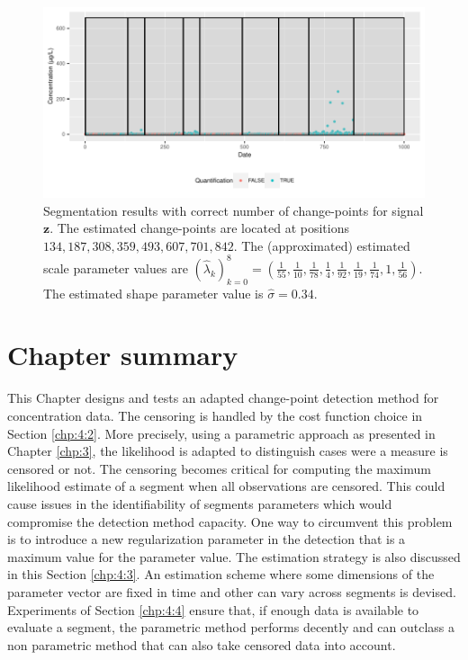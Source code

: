 \begin{figure}[htbp]
    \centering
    \includegraphics{figs/Chap4/y_sim2_detect.pdf}
    \caption{Segmentation results with correct number of change-points for signal $\bm z$. The estimated change-points are located at positions $134,187,308,359,493,607,701,842$. The (approximated) estimated scale parameter values are $(\widehat{\lambda}_k)_{k=0}^8 = (\frac{1}{55},\frac{1}{10},\frac{1}{78},\frac{1}{4},\frac{1}{92},\frac{1}{19},\frac{1}{74},1,\frac{1}{56})$. The estimated shape parameter value is $\widehat{\sigma} = 0.34$.}
    \label{fig:detect_sim_z}
\end{figure}


\clearpage

\section{Chapter summary}

This Chapter designs and tests an adapted change-point detection method for concentration data. The censoring is handled by the cost function choice in Section \ref{chp:4:2}. More precisely, using a parametric approach as presented in Chapter \ref{chp:3}, the likelihood is adapted to distinguish cases were a measure is censored or not. The censoring becomes critical for computing the maximum likelihood estimate of a segment when all observations are censored. This could cause issues in the identifiability of segments parameters which would compromise the detection method capacity. One way to circumvent this problem is to introduce a new regularization parameter in the detection that is a maximum value for the parameter value. The estimation strategy is also discussed in this Section \ref{chp:4:3}. An estimation scheme where some dimensions of the parameter vector are fixed in time and other can vary across segments is devised. Experiments of Section \ref{chp:4:4} ensure that, if enough data is available to evaluate a segment, the parametric method performs decently and can outclass a non parametric method that can also take censored data into account. 

